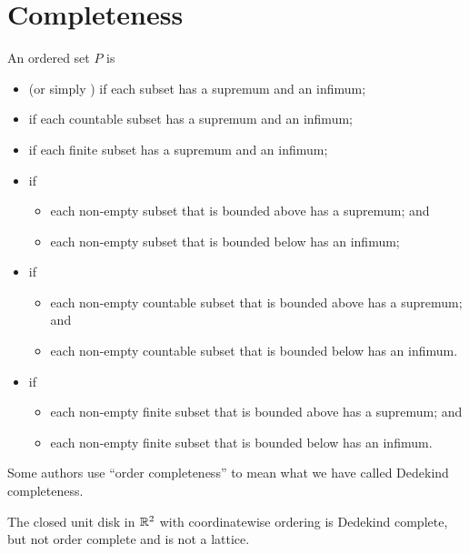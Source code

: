 \section{Completeness}
\begin{definition}
An ordered set $P$ is 
\begin{itemize}
\item {} (or simply ) if each subset has a supremum and an infimum;
\item {} if each countable subset has a supremum and an infimum;
\item {} if each finite subset has a supremum and an infimum;
\item {} if
\begin{itemize}
\item each non-empty subset that is bounded above has a supremum; and
\item each non-empty subset that is bounded below has an infimum;
\end{itemize}
\item {} if
\begin{itemize}
\item each non-empty countable subset that is bounded above has a supremum; and
\item each non-empty countable subset that is bounded below has an infimum.
\end{itemize}
\item {} if
\begin{itemize}
\item each non-empty finite subset that is bounded above has a supremum; and
\item each non-empty finite subset that is bounded below has an infimum.
\end{itemize}
\end{itemize}
\end{definition}
Some authors use ``order completeness'' to mean what we have called Dedekind completeness.

\begin{example}
The closed unit disk in $\mathbb{R}^2$ with coordinatewise ordering is Dedekind complete, but not order complete and is not a lattice.
\end{example}


